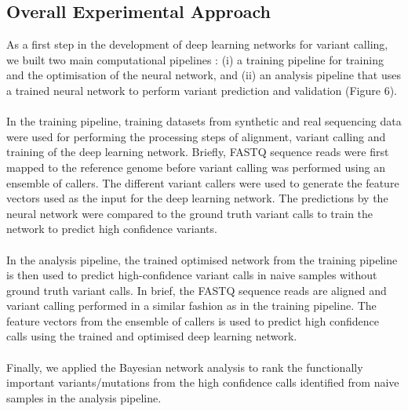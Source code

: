 \documentclass{article}
\begin{document}
\subsection{Overall Experimental Approach}
As a first step in the development of deep learning networks for variant calling, we  built two main computational pipelines : (i) a training pipeline for training and the optimisation of the neural network, and (ii) an analysis pipeline that uses a trained neural network to perform variant prediction and validation (Figure 6). \\\\
In the training pipeline, training datasets from synthetic and real sequencing data were used for performing the processing steps of alignment, variant calling and training of the deep learning network. Briefly, FASTQ sequence reads were first mapped to the reference genome before variant calling was performed using an ensemble of callers. The different variant callers were used to generate the feature vectors used as the input for the deep learning network. The predictions by the neural network were compared to the ground truth variant calls to train the network to predict high confidence variants.\\\\
 In the analysis pipeline, the trained optimised network from the training pipeline is then used to predict high-confidence variant calls in naive samples without ground truth variant calls. In brief, the FASTQ sequence reads are aligned and variant calling performed in a similar fashion as in the training pipeline. The feature vectors from the ensemble of callers is used to predict high confidence calls using the trained and optimised deep learning network.\\\\
 Finally, we applied the Bayesian network analysis to rank the functionally important variants/mutations from the high confidence calls identified from naive samples in the analysis pipeline.\\\\
\end{document}
